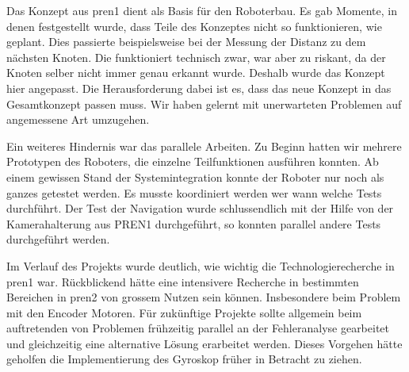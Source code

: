 Das Konzept aus \acrshort{pren1} dient als Basis für den Roboterbau. Es gab Momente, in denen festgestellt wurde, dass Teile des Konzeptes nicht so funktionieren, wie geplant. Dies passierte beispielsweise bei der Messung der Distanz zu dem nächsten Knoten. Die funktioniert technisch zwar, war aber zu riskant, da der Knoten selber nicht immer genau erkannt wurde. Deshalb wurde das Konzept hier angepasst. Die Herausforderung dabei ist es, dass das neue Konzept in das Gesamtkonzept passen muss. Wir haben gelernt mit unerwarteten Problemen auf angemessene Art umzugehen.

Ein weiteres Hindernis war das parallele Arbeiten. Zu Beginn hatten wir mehrere Prototypen des Roboters, die einzelne Teilfunktionen ausführen konnten. Ab einem gewissen Stand der Systemintegration konnte der Roboter nur noch als ganzes getestet werden. Es musste koordiniert werden wer wann welche Tests durchführt. Der Test der Navigation wurde schlussendlich mit der Hilfe von der Kamerahalterung aus PREN1 durchgeführt, so konnten parallel andere Tests durchgeführt werden.

Im Verlauf des Projekts wurde deutlich, wie wichtig die Technologierecherche in \acrshort{pren1} war. Rückblickend hätte eine intensivere Recherche in bestimmten Bereichen in \acrshort{pren2} von grossem Nutzen sein können. Insbesondere beim Problem mit den Encoder Motoren. Für zukünftige Projekte sollte allgemein beim auftretenden von Problemen frühzeitig parallel an der Fehleranalyse gearbeitet und gleichzeitig eine alternative Lösung erarbeitet werden. Dieses Vorgehen hätte geholfen die Implementierung des Gyroskop früher in Betracht zu ziehen.

